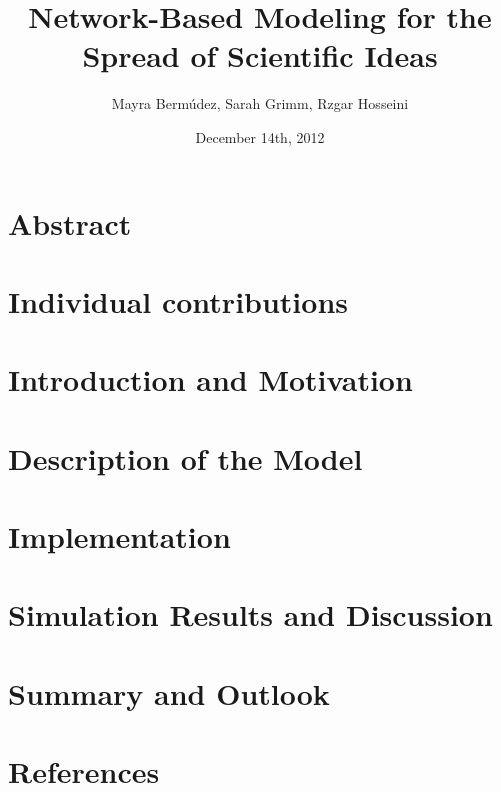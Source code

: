 \documentclass[11pt]{article}
\title{Network-Based Modeling for the Spread of Scientific Ideas}
\author{Mayra Berm\'udez, Sarah Grimm, Rzgar Hosseini}
\date{December 14th, 2012}
\begin{document}

\newpage



\newpage









\newpage
\tableofcontents

\newpage




\section{Abstract}

\newpage

\section{Individual contributions}

\newpage

\section{Introduction and Motivation}

\newpage

\section{Description of the Model}

\newpage

\section{Implementation}

\newpage

\section{Simulation Results and Discussion}

\newpage

\section{Summary and Outlook}

\newpage

\section{References}



\appendix





\newpage

\end{document}
